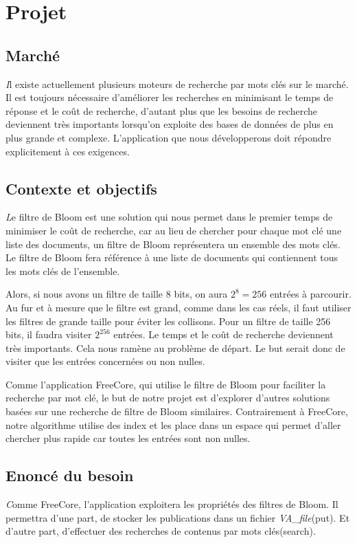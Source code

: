 \chapter{Projet}
\section{Marché}
		{\huge \itshape I}l existe actuellement plusieurs moteurs de recherche par mots clés sur le marché. Il est toujours nécessaire d’améliorer les recherches en minimisant le temps de réponse et le coût de recherche, d’autant plus que les besoins de recherche deviennent très importants lorsqu’on exploite des bases de données de plus en plus grande et complexe. L’application que nous développerons doit répondre explicitement à ces exigences.
		
	\section{Contexte et objectifs}
		{\huge \itshape L}e filtre de Bloom est une solution qui nous permet dans le premier temps de minimiser le coût de recherche, car au lieu de chercher pour chaque mot clé une liste des documents, un filtre de Bloom représentera un ensemble des mots clés. Le filtre de Bloom fera référence à une liste de documents qui contiennent tous les mots clés de l'ensemble.
		
		Alors, si nous avons un filtre de taille 8 bits, on aura $2^8 = 256$ entrées à parcourir. Au fur et à mesure que le filtre est grand, comme dans les cas réels, il faut utiliser les filtres de grande taille pour éviter les collisons. Pour un filtre de taille 256 bits, il faudra visiter $2^{256}$ entrées. Le temps et le coût de recherche deviennent très importants. Cela nous ramène au problème de départ. Le but serait donc de visiter que les entrées concernées ou non nulles.
		
	Comme l’application FreeCore\cite{freecore}, qui utilise le filtre de Bloom pour faciliter la recherche par mot clé, le but de notre projet est d'explorer d’autres solutions basées sur une recherche de filtre de Bloom similaires. Contrairement à FreeCore\cite{freecore}, notre algorithme utilise des index et les place dans un espace qui permet d'aller chercher plus rapide car toutes les entrées sont non nulles.
		
	\section{Enoncé du besoin}
		{\huge \itshape C}omme FreeCore, l’application exploitera les propriétés des filtres de Bloom. Il  permettra d’une part, de stocker les publications dans un fichier \textit{VA\_file}(put). Et d’autre part, d’effectuer des recherches de contenus par mots clés(search).
		
